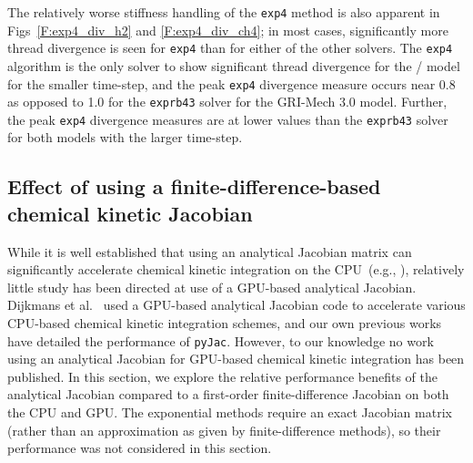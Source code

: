 \documentclass[preprint]{elsarticle}
\begin{document}
The relatively worse stiffness handling of the \texttt{exp4} method is also apparent in Figs~\ref{F:exp4_div_h2} and \ref{F:exp4_div_ch4}; in most cases, significantly more thread divergence is seen for \texttt{exp4} than for either of the other solvers.
The \texttt{exp4} algorithm is the only solver to show significant thread divergence for the \slash{} model for the smaller time-step, and the peak \texttt{exp4} divergence measure occurs near \num{0.8} as opposed to \num{1.0} for the \texttt{exprb43} solver for the GRI-Mech 3.0 model.
Further, the peak \texttt{exp4} divergence measures are at lower values than the \texttt{exprb43} solver for both models with the larger time-step.

\subsection{Effect of using a finite-difference-based chemical kinetic Jacobian}

While it is well established that using an analytical Jacobian matrix can significantly accelerate chemical kinetic integration on the CPU~(e.g., \cite{Lu:2009gh,stone2014comparison,Schwer2002270}), relatively little study has been directed at use of a GPU-based analytical Jacobian.
Dijkmans et al.~\cite{Dijkmans:2014bb} used a GPU-based analytical Jacobian code to accelerate various CPU-based chemical kinetic integration schemes, and our own previous works~\cite{Niemeyer:2016aa,Niemeyer:2015ws} have detailed the performance of \texttt{pyJac}.
However, to our knowledge no work using an analytical Jacobian for GPU-based chemical kinetic integration has been published.
In this section, we explore the relative performance benefits of the analytical Jacobian compared to a first-order finite-difference Jacobian on both the CPU and GPU.
The exponential methods require an exact Jacobian matrix (rather than an approximation as given by finite-difference methods), so their performance was not considered in this section.
\end{document}
